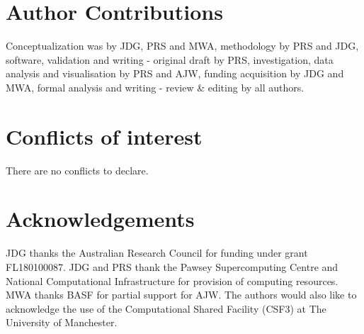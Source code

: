 \documentclass[twoside,twocolumn,9pt]{article}
\renewcommand{\refname}{Notes and references}
\begin{document}
\section*{Author Contributions}
Conceptualization was by JDG, PRS and MWA, methodology by PRS and JDG, software, validation and writing - original draft by PRS, investigation, data analysis and visualisation by PRS and AJW, funding acquisition by JDG and MWA, formal analysis and writing - review \& editing by all authors.

\section*{Conflicts of interest}
There are no conflicts to declare.

\section*{Acknowledgements}
JDG thanks the Australian Research Council for funding under grant FL180100087. JDG and PRS thank the Pawsey Supercomputing Centre and National Computational Infrastructure for provision of computing resources. MWA thanks BASF for partial support for AJW. The authors would also like to acknowledge the use of the Computational Shared Facility (CSF3) at The University of Manchester.



\balance


\end{document}
